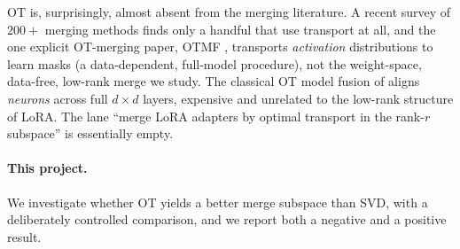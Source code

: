 \documentclass[11pt]{article}
\begin{document}
OT is, surprisingly, almost absent from the merging literature. A recent survey of $200{+}$ merging
methods finds only a handful that use transport at all, and the one explicit OT-merging paper, OTMF
\citep{pan2025otmf}, transports \emph{activation} distributions to learn masks (a data-dependent,
full-model procedure), not the weight-space, data-free, low-rank merge we study. The classical OT model
fusion of \citet{singh2020fusion} aligns \emph{neurons} across full $d\times d$ layers, expensive and
unrelated to the low-rank structure of LoRA. The lane ``merge LoRA adapters by optimal transport in the
rank-$r$ subspace'' is essentially empty.

\paragraph{This project.}
We investigate whether OT yields a better merge subspace than SVD, with a deliberately controlled
comparison, and we report both a negative and a positive result.
\end{document}
